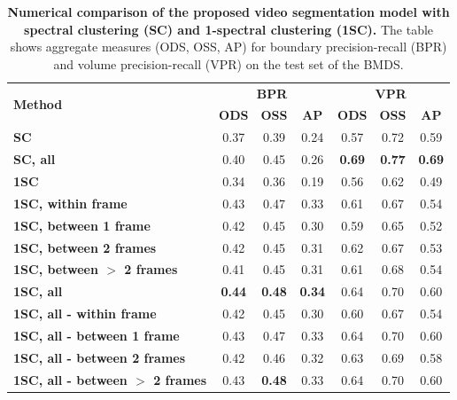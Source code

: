 \begin{table}[htbp]
\renewcommand{\arraystretch}{1.3}
\centering
\scriptsize
\begin{tabular}{|l||c|c|c||c|c|c||}
\hline 
\multirow{2}{*}{\textbf{Method}} & \multicolumn{3}{c||}{\textbf{BPR}} & \multicolumn{3}{c||}{\textbf{VPR}}\\
\cline{2-7}
& \textbf{ODS}  & \textbf{OSS} & \textbf{AP}
& \textbf{ODS} & \textbf{OSS} & \textbf{AP}\\
\hline
\hline
\textbf{SC} & 0.37 & 0.39 & 0.24 & 0.57 &0.72 & 0.59 \\
\hline 
\hline
\textbf{SC, all} & 0.40 & 0.45 & 0.26 & \textbf{0.69} & \textbf{0.77} & \textbf{0.69} \\
\hline \hline
\textbf{1SC} & 0.34 & 0.36 & 0.19 & 0.56 & 0.62 & 0.49\\
\hline
\textbf{1SC, within frame} & 0.43 & 0.47 & 0.33 & 0.61 & 0.67 & 0.54\\
\hline
\textbf{1SC, between 1 frame} & 0.42 & 0.45 & 0.30 & 0.59 & 0.65 & 0.52\\
\hline
\textbf{1SC, between 2 frames} & 0.42 & 0.45 & 0.31 & 0.62 & 0.67 & 0.53\\
\hline
\textbf{1SC, between $>$ 2 frames} & 0.41 & 0.45 & 0.31 & 0.61 & 0.68 & 0.54 \\
\hline
\textbf{1SC, all} & \textbf{0.44} & \textbf{0.48} & \textbf{0.34} & 0.64 & 0.70 & 0.60 \\
\hline
\hline
\textbf{1SC, all - within frame} & 0.42 & 0.45 & 0.30 & 0.60 & 0.67 & 0.54 \\
\hline
\textbf{1SC, all - between 1 frame} & 0.43 & 0.47 & 0.33 & 0.64 & 0.70 & 0.60 \\
\hline
\textbf{1SC, all - between 2 frames} & 0.42 & 0.46 & 0.32 & 0.63 & 0.69 & 0.58 \\
\hline
\textbf{1SC, all - between $>$ 2 frames} & 0.43 & \textbf{0.48} & 0.33 & 0.64 & 0.70 & 0.60 \\
\hline
\end{tabular}
 \caption{{\bf Numerical comparison of the proposed video segmentation model with spectral clustering (SC) and 1-spectral clustering (1SC).} 
The table shows aggregate measures (ODS, OSS, AP) for boundary precision-recall (BPR) and volume precision-recall (VPR) on the test set of the BMDS.}
\label{tab:ml_comparison_1sc}
\end{table}
\renewcommand*{\thesubfigure}{}
